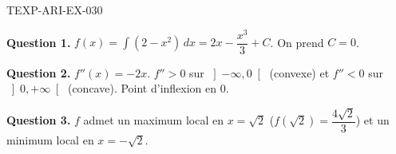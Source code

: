 \begin{corrige}{TEXP-ARI-EX-030}

\textbf{Question 1.} $f(x) = \int (2 - x^2)\,dx = 2x - \dfrac{x^3}{3} + C$. On prend $C = 0$.


\textbf{Question 2.} $f''(x) = -2x$. $f'' > 0$ sur $\left]-\infty, 0\right[$ (convexe) et $f'' < 0$ sur $\left]0, +\infty\right[$ (concave). Point d'inflexion en $0$.

\textbf{Question 3.} $f$ admet un maximum local en $x = \sqrt{2}$ ($f(\sqrt{2}) = \dfrac{4\sqrt{2}}{3}$) et un minimum local en $x = -\sqrt{2}$.

\end{corrige}
